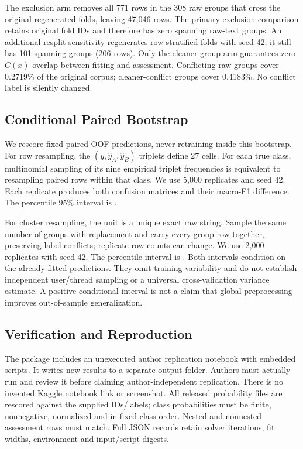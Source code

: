 \documentclass[doublecolumn]{ijcvsplatex}
\begin{document}
The exclusion arm removes all 771 rows in the 308 raw groups that cross the original regenerated folds, leaving 47,046 rows. The primary exclusion comparison retains original fold IDs and therefore has zero spanning raw-text groups. An additional resplit sensitivity regenerates row-stratified folds with seed 42; it still has 101 spanning groups (206 rows). Only the cleaner-group arm guarantees zero $C(x)$ overlap between fitting and assessment. Conflicting raw groups cover 0.2719\% of the original corpus; cleaner-conflict groups cover 0.4183\%. No conflict label is silently changed.

\subsection{Conditional Paired Bootstrap}
We rescore fixed paired OOF predictions, never retraining inside this bootstrap. For row resampling, the $(y,\hat y_A,\hat y_B)$ triplets define 27 cells. For each true class, multinomial sampling of its nine empirical triplet frequencies is equivalent to resampling paired rows within that class. We use 5,000 replicates and seed 42. Each replicate produces both confusion matrices and their macro-F1 difference. The percentile 95\% interval is \RowCI.

For cluster resampling, the unit is a unique exact raw string. Sample the same number of groups with replacement and carry every group row together, preserving label conflicts; replicate row counts can change. We use 2,000 replicates with seed 42. The percentile interval is \ClusterCI. Both intervals condition on the already fitted predictions. They omit training variability and do not establish independent user/thread sampling or a universal cross-validation variance estimate. A positive conditional interval is not a claim that global preprocessing improves out-of-sample generalization.

\subsection{Verification and Reproduction}
The package includes an unexecuted author replication notebook with embedded scripts. It writes new results to a separate output folder. Authors must actually run and review it before claiming author-independent replication. There is no invented Kaggle notebook link or screenshot. All released probability files are rescored against the supplied IDs/labels; class probabilities must be finite, nonnegative, normalized and in fixed class order. Nested and nonnested assessment rows must match. Full JSON records retain solver iterations, fit widths, environment and input/script digests.
\end{document}
